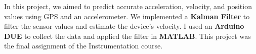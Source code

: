 \item{In this project, we aimed to predict accurate acceleration, velocity, and position values using GPS and an accelerometer. We implemented a \textbf{Kalman Filter} to filter the sensor values and estimate the device's velocity. I used an \textbf{Arduino DUE} to collect the data and applied the filter in \textbf{MATLAB}. This project was the final assignment of the Instrumentation course.}

